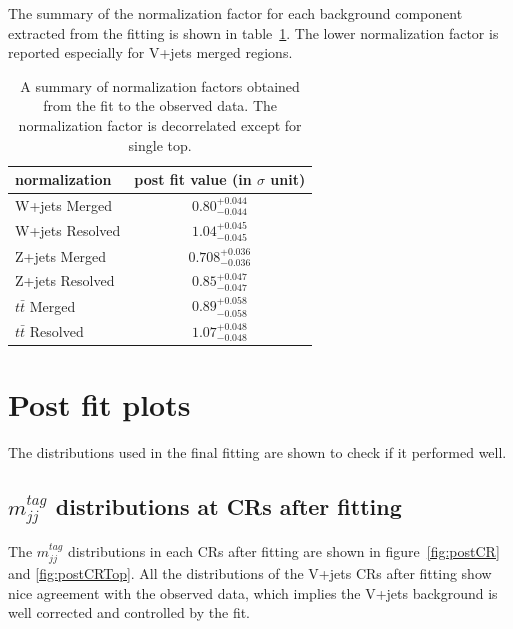 The summary of the normalization factor for each background component extracted from the fitting is shown in table~\ref{tab:postnorm}. 
The lower normalization factor is reported especially for V+jets merged regions. 
\begin{table}[htbp]
\begin{center}
\begin{tabular}{|l|c|}
\hline
normalization & post fit value (in $\sigma$ unit) \\\hline
W+jets Merged & $0.80^{+0.044}_{-0.044}$ \\
W+jets Resolved & $1.04^{+0.045}_{-0.045}$ \\
Z+jets Merged & $0.708^{+0.036}_{-0.036}$ \\
Z+jets Resolved & $0.85^{+0.047}_{-0.047}$ \\
$t\bar{t}$ Merged & $0.89^{+0.058}_{-0.058}$ \\
$t\bar{t}$ Resolved & $1.07^{+0.048}_{-0.048}$ \\
\hline
\end{tabular}
\caption{\label{tab:postnorm} A summary of normalization factors obtained from the fit to the observed data. The normalization factor is decorrelated except for single top. }
\end{center}
\end{table}

\section{Post fit plots}
\label{sec:postfitplots}
The distributions used in the final fitting are shown to check if it performed well.
\subsection{ $m^{tag}_{jj}$ distributions at CRs after fitting }
The $m^{tag}_{jj}$ distributions in each CRs after fitting are shown in figure~\ref{fig:postCR} and \ref{fig:postCRTop}.
All the distributions of the V+jets CRs after fitting show nice agreement with the observed data, which implies the V+jets background is well corrected and controlled by the fit.

